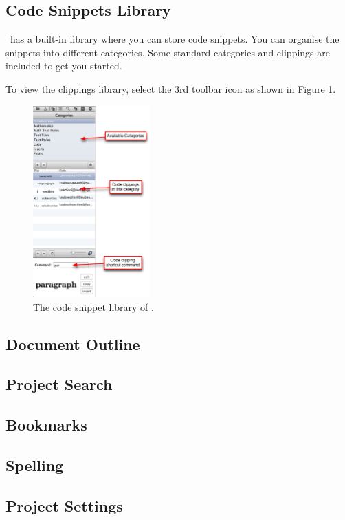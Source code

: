 \subsection{Code Snippets Library}
\label{sec:navigators:codelibrary}

\texnicle\ has a built-in library where you can store code snippets. You can
organise the snippets into different categories. Some standard categories and
clippings are included to get you started.

To view the clippings library, select the 3rd toolbar icon as shown in Figure
\ref{fig:codelibrary}.

\begin{figure}[htbp]
\centering
\includegraphics[width=0.4\textwidth]{userguide/images/codelibrary.png}
\caption{The code snippet library of \texnicle.}
\label{fig:codelibrary}
\end{figure}


\subsection{Document Outline}
\label{sec:navigators:documentoutline}

\subsection{Project Search}
\label{sec:navigators:projectsearch}

\subsection{Bookmarks}
\label{sec:navigators:bookmarks}

\subsection{Spelling}
\label{sec:navigators:spelling}

\subsection{Project Settings}
\label{sec:navigators:settings}
